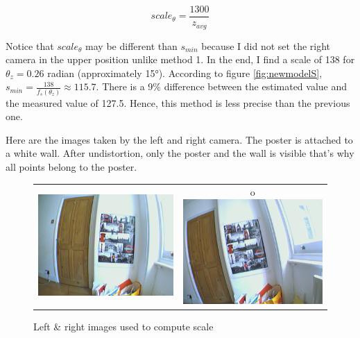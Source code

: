 \documentclass[11pt]{report}
\begin{document}
\begin{equation}
  scale_\theta = \frac{1300}{z_{avg}}
\end{equation}

Notice that $scale_\theta$ may be different than $s_{min}$ because I did not set the right camera in the upper position unlike method 1. In the end, I find a scale of 138 for $\theta_z = 0.26$ radian (approximately \ang{15}). According to figure \ref{fig:newmodelS}, $s_{min} = \frac{138}{f_s(\theta_z)} \approx 115.7$. There is a 9\% difference between the estimated value and the measured value of 127.5. Hence, this method is less precise than the previous one.

Here are the images taken by the left and right camera. The poster is attached to a white wall. After undistortion, only the poster and the wall is visible that's why all points belong to the poster.
\begin{figure}[H]
\centering
\begin{tabular}{cc}
\includegraphics[scale=0.25]{images/left_scale.png} &
o\includegraphics[scale=0.25]{images/right_scale.png} \\
\end{tabular}
\caption{Left \& right images used to compute scale}
\end{figure}
\end{document}
